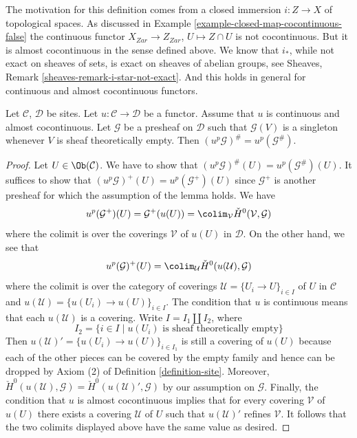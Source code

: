 \noindent
The motivation for this definition comes from a closed immersion
$i : Z \to X$ of topological spaces. As discussed in
Example \ref{example-closed-map-cocontinuous-false}
the continuous functor
$X_{Zar} \to Z_{Zar}$, $U \mapsto Z \cap U$ is
not cocontinuous. But it is almost cocontinuous in the sense defined above.
We know that $i_*$, while not exact on sheaves of sets, is
exact on sheaves of abelian groups, see
Sheaves, Remark \ref{sheaves-remark-i-star-not-exact}.
And this holds in general for continuous and almost cocontinuous functors.

\begin{lemma}
\label{lemma-almost-cocontinuous-sheafification}
Let $\mathcal{C}$, $\mathcal{D}$ be sites.
Let $u : \mathcal{C} \to \mathcal{D}$ be a functor.
Assume that $u$ is continuous and almost cocontinuous.
Let $\mathcal{G}$ be a presheaf on $\mathcal{D}$ such that $\mathcal{G}(V)$ is
a singleton whenever $V$ is sheaf theoretically empty.
Then $(u^p\mathcal{G})^\# = u^p(\mathcal{G}^\#)$.
\end{lemma}

\begin{proof}
Let $U \in \Ob(\mathcal{C})$. We have to show that
$(u^p\mathcal{G})^\#(U) = u^p(\mathcal{G}^\#)(U)$.
It suffices to show that
$(u^p\mathcal{G})^+(U) = u^p(\mathcal{G}^+)(U)$
since $\mathcal{G}^+$ is another presheaf for which the
assumption of the lemma holds. We have
$$
u^p(\mathcal{G}^+)(U) =
\mathcal{G}^+(u(U)) =
\colim_\mathcal{V} \check H^0(\mathcal{V}, \mathcal{G})
$$
where the colimit is over the coverings $\mathcal{V}$ of $u(U)$ in
$\mathcal{D}$. On the other hand, we see that
$$
u^p(\mathcal{G})^+(U) =
\colim_\mathcal{U} \check H^0(u(\mathcal{U}), \mathcal{G})
$$
where the colimit is over the category of coverings
$\mathcal{U} = \{U_i \to U\}_{i \in I}$ of $U$ in $\mathcal{C}$ and
$u(\mathcal{U}) = \{u(U_i) \to u(U)\}_{i \in I}$. The condition
that $u$ is continuous means that each $u(\mathcal{U})$ is a covering.
Write $I = I_1 \amalg I_2$, where
$$
I_2 = \{i \in I \mid u(U_i)\text{ is sheaf theoretically empty}\}
$$
Then $u(\mathcal{U})' = \{u(U_i) \to u(U)\}_{i \in I_1}$ is still a covering of $u(U)$
because each of the other pieces can be covered by the empty family
and hence can be dropped by Axiom (2) of
Definition \ref{definition-site}.
Moreover,
$\check H^0(u(\mathcal{U}), \mathcal{G}) =
\check H^0(u(\mathcal{U})', \mathcal{G})$
by our assumption on $\mathcal{G}$. Finally, the condition that $u$ is
almost cocontinuous implies that for every covering $\mathcal{V}$
of $u(U)$ there exists a covering $\mathcal{U}$ of $U$ such that
$u(\mathcal{U})'$ refines $\mathcal{V}$. It follows that the two colimits
displayed above have the same value as desired.
\end{proof}

